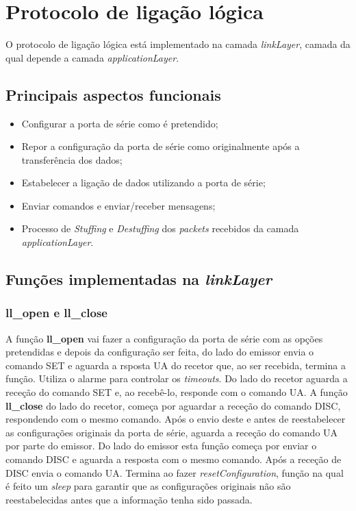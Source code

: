 \documentclass[11pt]{article}
\begin{document}

\newpage
\section{Protocolo de ligação lógica}

O protocolo de ligação lógica está implementado na camada \textit{linkLayer}, camada da qual depende a camada \textit{applicationLayer}.

\subsection{Principais aspectos funcionais}
\small
\begin{itemize}
\setlength\itemsep{0em}
  \item Configurar a porta de série como é pretendido;
  \item Repor a configuração da porta de série como originalmente após a transferência dos dados;
  \item  Estabelecer a ligação de dados utilizando a porta de série;
  \item  Enviar comandos e  enviar/receber mensagens;
  \item Processo de \textit{Stuffing} e \textit{Destuffing} dos \textit{packets} recebidos da camada \textit{applicationLayer}.
\end{itemize}
\normalsize


\subsection{Funções implementadas na \textit{linkLayer}}

 \subsubsection{ll\_open e ll\_close} 

  A função \textbf{ll\_open} vai fazer a configuração da porta de série com as opções pretendidas e depois da configuração ser feita, do lado do emissor envia o comando SET e aguarda a rsposta UA do recetor que, ao ser recebida, termina a função. Utiliza o alarme para controlar os \textit{timeouts}. Do lado do recetor aguarda a receção do comando SET e, ao recebê-lo, responde com o comando UA. A função \textbf{ll\_close} do lado do recetor, começa por aguardar a receção do comando DISC, respondendo com o mesmo comando. Após o envio deste e antes de reestabelecer as configurações originais da porta de série, aguarda a receção do comando UA por parte do emissor. Do lado do emissor esta função começa por enviar o comando DISC e aguarda a resposta com o mesmo comando. Após a receção de DISC envia o comando UA. Termina ao fazer \textit{resetConfiguration}, função na qual é feito um \textit{sleep} para garantir que as configurações originais não são reestabelecidas antes que a informação tenha sido passada.
   
\end{document}
